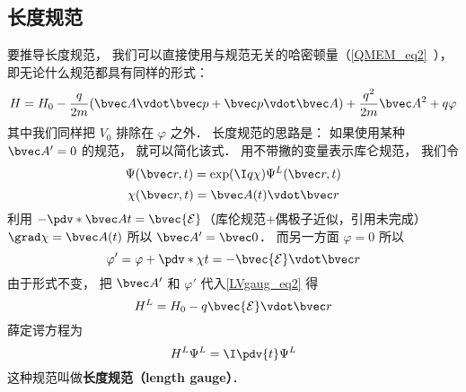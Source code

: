 \subsection{长度规范}
要推导长度规范， 我们可以直接使用与规范无关的哈密顿量（\autoref{QMEM_eq2}~）， 即无论什么规范都具有同样的形式：
\begin{equation}\label{LVgaug_eq2}
H = H_0 - \frac{q}{2m} (\bvec A \vdot \bvec p + \bvec p \vdot \bvec A)
+ \frac{q^2}{2m} \bvec A^2 + q \varphi
\end{equation}
其中我们同样把 $V_0$ 排除在 $\varphi$ 之外． 长度规范的思路是： 如果使用某种 $\bvec A' = 0$ 的规范， 就可以简化该式． 用不带撇的变量表示库仑规范， 我们令
\begin{equation}
\Psi(\bvec r, t) = \exp(\I q\chi)\Psi^L(\bvec r, t)
\end{equation}
\begin{equation}
\chi(\bvec r, t) = \bvec A(t) \vdot \bvec r
\end{equation}
利用 $-\pdv*{\bvec A}{t} = \bvec {\mathcal E}$（库伦规范+偶极子近似，引用未完成） $\grad \chi = \bvec A(t)$ 所以 $\bvec A' = \bvec 0$． 而另一方面 $\varphi = 0$ 所以
\begin{equation}
\varphi' = \varphi + \pdv*{\chi}{t} = -\bvec {\mathcal E} \vdot \bvec r
\end{equation}
由于形式不变， 把 $\bvec A'$ 和 $\varphi'$ 代入\autoref{LVgaug_eq2} 得
\begin{equation}
H^L = H_0 - q\bvec{\mathcal{E}} \vdot \bvec r
\end{equation}
薛定谔方程为
\begin{equation}
H^L \Psi^L = \I \pdv{t} \Psi^L
\end{equation}
这种规范叫做\textbf{长度规范（length gauge）}．
